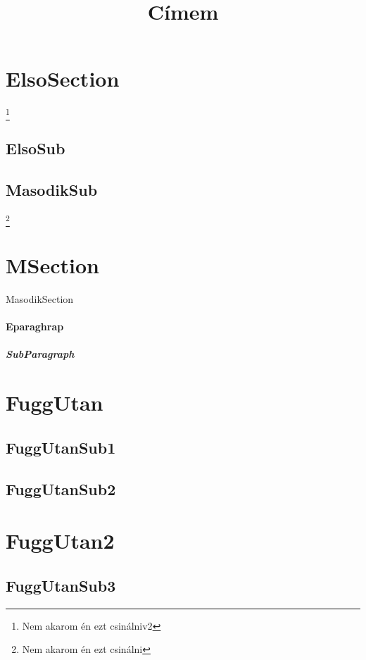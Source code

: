 \documentclass[twoside]{article}
\begin{document}
\title{Címem}
\maketitle 

\begin{abstract}
\hulipsum[1-2]
\end{abstract}

\tableofcontents
{}
\pagebreak

\section{ElsoSection} \footnote{Nem akarom én ezt csinálniv2}
\subsection{ElsoSub}
\hulipsum[1-2]

\subsection{MasodikSub}
\hulipsum[1-2]

\footnote{Nem akarom én ezt csinálni}

\pagebreak

\section{MSection}{MasodikSection}
\paragraph {Eparaghrap}
\subparagraph{SubParagraph}

\appendix

\section{FuggUtan}
\subsection{FuggUtanSub1}

\quote
\hulipsum[1]


\subsection{FuggUtanSub2}

\section{FuggUtan2}
\quotation
\hulipsum[1]

\subsection{FuggUtanSub3}
\verse 
\hulipsum[1]
\end{document}
